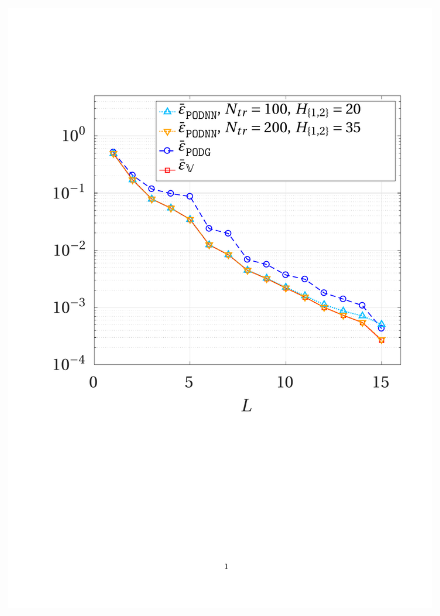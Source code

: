 \documentclass[12pt, a4paper, twoside, openright, notitlepage]{report}
\numberwithin{equation}{chapter}
\theoremstyle{theorem}
\theoremstyle{definition}
\theoremstyle{remark}
\theoremstyle{proposition}
\numberwithin{figure}{chapter}
\begin{document}
		\begin{figure}[H]
			\center
			\includegraphics[scale = 0.39, trim = {1.5cm 9cm 1.5cm 3.5cm}, clip]{poisson2d_1_error_vs_rank}
			\hspace*{0.5cm}

\end{figure}
\end{document}
